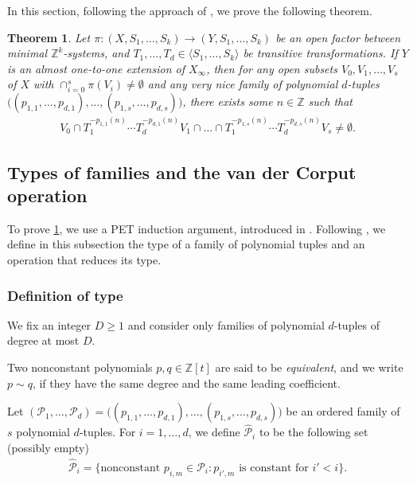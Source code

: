 \documentclass[11pt,reqno]{amsart}
\newcommand{\Z}{\mathbb{Z}}
\newcommand{\cP}{{\mathcal P}}
\newtheorem{theorem}{Theorem}[section]
\theoremstyle{definition}
\theoremstyle{remark}
\begin{document}
In this section, following the approach of \cite{Chu_Frantzikinakis_Host_ergodic_averages_distinct_degree:2011,Qiu_poly_orbits_tot_minimal:2023}, we prove the following theorem.\begin{theorem}\label{thm: TFC_nice_pol}
    Let $\pi\colon (X,S_1,\dots,S_k) \to (Y,S_1,\dots,S_k)$ be an open factor between minimal $\Z^k$-systems, and $T_1,\dots,T_d\in \langle S_{1},\dots,S_{k}\rangle$ be transitive transformations. If $Y$ is an almost one-to-one extension of $X_\infty$, then for any open subsets $V_{0},V_{1},\dots,V_{s}$ of $X$ with $\cap_{i=0}^{s}\pi(V_i)\neq \emptyset$ and any very nice family of polynomial $d$-tuples $\big( (p_{1,1},\dots,p_{d,1}),\dots,(p_{1,s},\dots,p_{d,s})\big)$, there exists some $n\in \Z$ such that\begin{align*}
        V_{0}\cap T_{1}^{-p_{1,1}(n)}\cdots T_{d}^{-p_{d,1}(n)}V_{1}\cap \dots \cap T_{1}^{-p_{1,s}(n)}\cdots T_{d}^{-p_{d,s}(n)}V_{s}\neq \emptyset.
    \end{align*}
\end{theorem}


\subsection{Types of families and the van der Corput operation}

To prove \cref{thm: TFC_nice_pol}, we use a PET induction argument, introduced in \cite{Bergelson_WM_PET:1987}. Following \cite{Chu_Frantzikinakis_Host_ergodic_averages_distinct_degree:2011,Bergelson_Leibman96}, we define in this subsection the type of a family of polynomial tuples and an operation that reduces its type.

\subsubsection{Definition of type}

We fix an integer $D\geq 1$ and consider only families of polynomial $d$-tuples of degree at most $D$.

Two nonconstant polynomials $p,q\in\Z[t]$ are said to be \emph{equivalent}, and we write $p\sim q$, if they have the same degree and the same leading coefficient.

Let $(\cP_1,\dots,\cP_d) = \big( (p_{1,1},\dots,p_{d,1}),\dots,(p_{1,s},\dots,p_{d,s})\big)$ be an ordered family of $s$ polynomial $d$-tuples. For $i=1,\ldots, d$, we define $\widehat{\cP}_i$ to be the following set (possibly empty)\begin{align*}
    \widehat{\cP}_i=\{ \text{nonconstant } p_{i,m} \in \cP_i\colon p_{i',m} \text{ is constant for } i'<i\}.
\end{align*}
\end{document}
